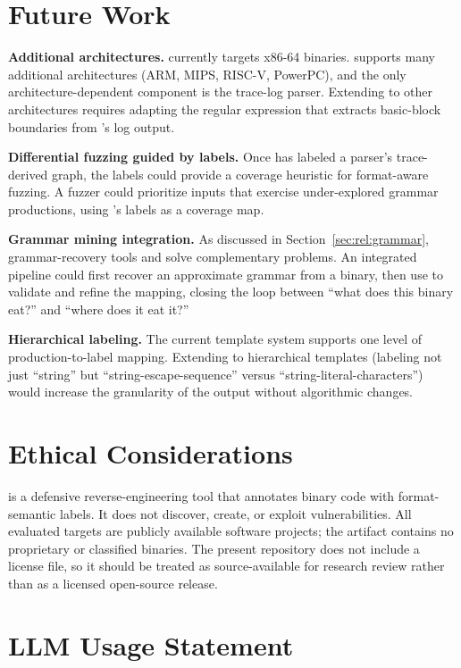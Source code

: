 \section{Future Work}\label{sec:future}

\textbf{Additional architectures.}
\toolname currently targets x86-64 binaries.
\QEMU supports many additional architectures (ARM, MIPS, RISC-V, PowerPC), and the only architecture-dependent component is the trace-log parser.
Extending to other architectures requires adapting the regular expression that extracts basic-block boundaries from \QEMU's log output.

\textbf{Differential fuzzing guided by labels.}
Once \toolname has labeled a parser's trace-derived graph, the labels could provide a coverage heuristic for format-aware fuzzing.
A fuzzer could prioritize inputs that exercise under-explored grammar productions, using \toolname's labels as a coverage map.

\textbf{Grammar mining integration.}
As discussed in Section~\ref{sec:rel:grammar}, grammar-recovery tools and \toolname solve complementary problems.
An integrated pipeline could first recover an approximate grammar from a binary, then use \toolname to validate and refine the mapping, closing the loop between ``what does this binary eat?'' and ``where does it eat it?''

\textbf{Hierarchical labeling.}
The current template system supports one level of production-to-label mapping.
Extending to hierarchical templates (labeling not just ``string'' but ``string-escape-sequence'' versus ``string-literal-characters'') would increase the granularity of the output without algorithmic changes.

\section{Ethical Considerations}\label{sec:ethics}

\toolname is a defensive reverse-engineering tool that annotates binary code with format-semantic labels.
It does not discover, create, or exploit vulnerabilities.
All evaluated targets are publicly available software projects; the artifact contains no proprietary or classified binaries.
The present repository does not include a license file, so it should be treated as source-available for research review rather than as a licensed open-source release.

\section{LLM Usage Statement}\label{sec:llm}

